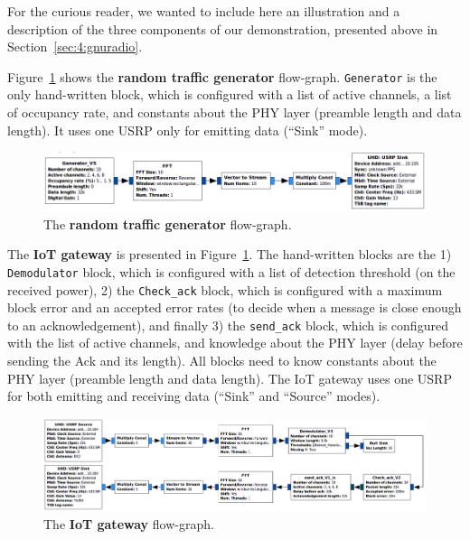 For the curious reader, we wanted to include here an illustration and a description of the three components of our demonstration, presented above in Section~\ref{sec:4:gnuradio}.

Figure~\ref{fig:4app:USRP_TX_PU__v1__simple_grc} shows the \textbf{random traffic generator} flow-graph.
\texttt{Generator} is the only hand-written block, which is configured with a list of active channels, a list of occupancy rate, and constants about the PHY layer (preamble length and data length). It uses one USRP only for emitting data (``Sink'' mode).

\begin{figure}[!h]
	\centering
    \includegraphics[width=1.00\textwidth]{2-Chapters/4-Chapter/Images/USRP_TX_PU__v1__simple_grc.png}
    \caption{The \textbf{random traffic generator} flow-graph.}
    \label{fig:4app:USRP_TX_PU__v1__simple_grc}
\end{figure}


The \textbf{IoT gateway} is presented in Figure~\ref{fig:4app:USRP_TX_PU__v1__simple_grc}.
%
The hand-written blocks are the 1) \texttt{Demodulator} block, which is configured with a list of detection threshold (on the received power), 2) the \texttt{Check\_ack} block, which is configured with a maximum block error and an accepted error rates (to decide when a message is close enough to an acknowledgement), and finally 3) the \texttt{send\_ack} block, which is configured with the list of active channels, and knowledge about the PHY layer (delay before sending the Ack and its length). All blocks need to know constants about the PHY layer (preamble length and data length). The IoT gateway uses one USRP for both emitting and receiving data (``Sink'' and ``Source'' modes).

\begin{figure}[!h]
	\centering
    \includegraphics[width=1.00\textwidth]{2-Chapters/4-Chapter/Images/USRP_RX_BTS__v1__simple_grc.png}
    \caption{The \textbf{IoT gateway} flow-graph.}
    \label{fig:4app:USRP_RX_BTS__v1__simple_grc}
\end{figure}


